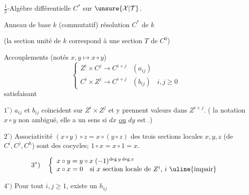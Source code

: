 $\frac12$-Algèbre différentielle $C^*$ sur  $\unsure{\mathcal X|\mathcal T}$.

Anneau de base $k$ (commutatif)
résolution $C^*$ de $k$



(la section unité de $k$ correspond à une section $T$ de $C^0$)


Accouplements (notés $x,y\longmapsto x\circ y$)
\[
\left\{\begin{array}{lll}
Z^i\times C^j\longrightarrow C^{i+j}&(a_{ij})\\
C^i\times Z^j\longrightarrow C^{i+j}&(b_{ij})&i,j\geq0
\end{array}\right.
\]
satisfaisant 

$1^\circ)$ $a_{ij}$ et $b_{ij}$ coïncident sur $Z^i\times Z^j$ et
y prennent valeurs dans $Z^{i+j}$. ( la notation
$x\circ y$ non ambiguë, elle a un sens si $dx$ \uline{ou} $dy$ est .)

$2^\circ)$ Associativité $(x\circ y)\circ z=x\circ(y\circ z)$ 
des trois sections locales $x,y,z$ (de $C^i,C^j,C^h$)
sont des cocycles; $1\circ x=x\circ1=x$.

\[
3^\circ)\quad\left\{\begin{array}{l}
x\circ y=y\circ x\;(-1)^{\deg y\deg x}\\
x\circ x=0\quad\text{si $x$ section locale de $Z^i$, $i$ \uline{impair}}
\end{array}\right.
\]


$4^\circ)$ Pour tout $i,j\geq1$, existe un $h_{ij}$ 


